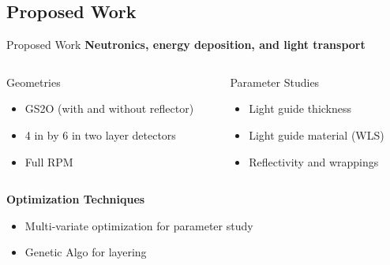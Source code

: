 \subsection{Proposed Work}
\begin{frame}{Proposed Work}
  \textbf{Neutronics, energy deposition, and light transport}
  \vspace{0.5cm}
  \begin{columns}[onlytextwidth]
    \begin{column}{0.45\textwidth}
      Geometries
      \begin{itemize}
        \item GS2O  (with and without reflector)
        \item 4 in by 6 in two layer detectors
        \item Full RPM
      \end{itemize}
    \end{column}
    \begin{column}{0.45\textwidth}
      Parameter Studies
      \begin{itemize}
        \item Light guide thickness
        \item Light guide material (WLS)
        \item Reflectivity and wrappings
      \end{itemize}
    \end{column}
  \end{columns}
  \vspace{0.5cm}
  \textbf{Optimization Techniques}
  \vspace{0.5cm}
  \begin{itemize}
    \item Multi-variate optimization for parameter study
    \item Genetic Algo for layering
  \end{itemize}
\end{frame}
